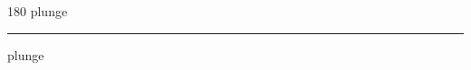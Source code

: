 
\begin{frame}
\begin{center}
\begin{turn}{180}
{\fontsize{2.5cm}{1em}\selectfont plunge}
\end{turn}
\vspace{1em}\par  
\hrule
\vspace{1em}\par  
{\fontsize{2.5cm}{1em}\selectfont plunge}
\end{center}
\end{frame}
